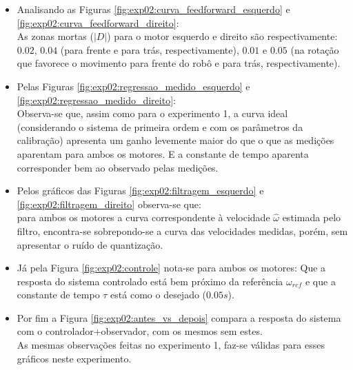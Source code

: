 \begin{itemize}
    \item Analisando as Figuras \ref{fig:exp02:curva_feedforward_esquerdo} e \ref{fig:exp02:curva_feedforward_direito}:\\
        As zonas mortas ($|D|$) para o motor esquerdo e direito são respectivamente: $0.02$, $0.04$ (para frente e para trás, respectivamente), $0.01$ e $0.05$ (na rotação que favorece o movimento para frente do robô e para trás, respectivamente).
    \item Pelas Figuras \ref{fig:exp02:regressao_medido_esquerdo} e \ref{fig:exp02:regressao_medido_direito}:\\
        Observa-se que, assim como para o experimento 1, a curva ideal (considerando o sistema de primeira ordem e com os parâmetros da calibração) apresenta um ganho levemente maior do que o que as medições aparentam para ambos os motores. E a constante de tempo aparenta corresponder bem ao observado pelas medições.
    \item Pelos gráficos das Figuras \ref{fig:exp02:filtragem_esquerdo} e \ref{fig:exp02:filtragem_direito} observa-se que:\\
        para ambos os motores a curva correspondente à velocidade $\hat{\omega}$ estimada pelo filtro, encontra-se sobrepondo-se a curva das velocidades medidas, porém, sem apresentar o ruído de quantização.
    \item Já pela Figura \ref{fig:exp02:controle} nota-se para ambos os motores:
        Que a resposta do sistema controlado está bem próximo da referência $\omega_{ref}$ e que a constante de tempo $\tau$ está como o desejado ($0.05s$).
    \item Por fim a Figura \ref{fig:exp02:antes_vs_depois} compara a resposta do sistema com o controlador+observador, com os mesmos sem estes. \\
        As mesmas observações feitas no experimento 1, faz-se válidas para esses gráficos neste experimento.
\end{itemize}

